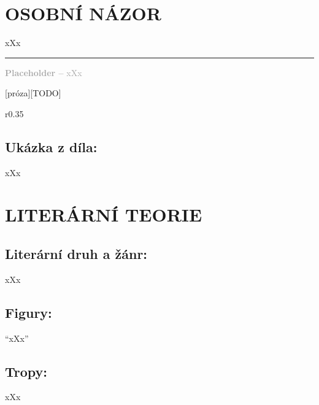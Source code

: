 \documentclass{extarticle} %
\begin{document}
\section*{OSOBNÍ NÁZOR}
\noindent 
xXx

\vfill

\noindent\begin{minipage}{\textwidth}
    \textcolor{darkgray}{\rule{\linewidth}{0.4pt}
    \footnotesize
    \textbf{Placeholder --} xXx
    }
\end{minipage}

\newpage


\changefontsize{8pt}

[próza][TODO]

\noindent\begin{wrapfigure}{r}{0.35\textwidth}
\tiny

\subsection*{Ukázka z díla:}
\setlength{\parindent}{3pt}
xXx
\end{wrapfigure}

\section*{LITERÁRNÍ TEORIE}

\subsection*{Literární druh a žánr:}
\noindent xXx



\subsection*{Figury:}
\noindent 
\enquote{xXx}

\subsection*{Tropy:}
\noindent 
xXx
\end{document}
